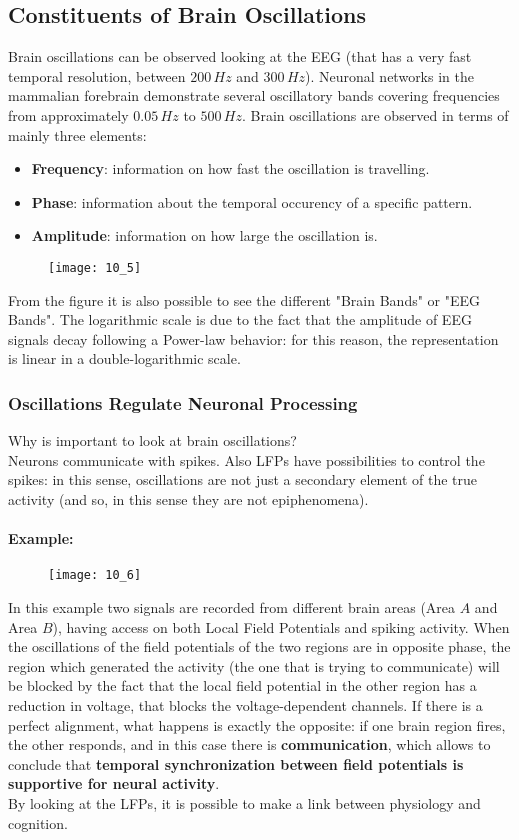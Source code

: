 \subsection{Constituents of Brain Oscillations}
Brain oscillations can be observed looking at the EEG (that has a very fast temporal resolution, between \(200\,Hz\) and \(300\,Hz\)).
Neuronal networks in the mammalian forebrain demonstrate several oscillatory bands covering frequencies from approximately \(0.05\,Hz\) to \(500\,Hz\).
Brain oscillations are observed in terms of mainly three elements:
\begin{itemize}
    \item \textbf{Frequency}: information on how fast the oscillation is travelling.
    \item \textbf{Phase}: information about the temporal occurency of a specific pattern.
    \item \textbf{Amplitude}: information on how large the oscillation is.
\end{itemize}
\begin{figure}[H]
    \texttt{[image: 10\_5]}
    \centering
\end{figure}
From the figure it is also possible to see the different "Brain Bands" or "EEG Bands". The logarithmic scale is due to the fact that the amplitude of EEG 
signals decay following a Power-law behavior: for this reason, the representation is linear in a double-logarithmic scale.

\subsubsection{Oscillations Regulate Neuronal Processing}
Why is important to look at brain oscillations? \\ Neurons communicate with spikes. Also LFPs have possibilities to control the spikes: in this sense, 
oscillations are not just a secondary element of the true activity (and so, in this sense they are not epiphenomena).

\paragraph{Example:}
\begin{figure}[H]
    \texttt{[image: 10\_6]}
    \centering
\end{figure}
In this example two signals are recorded from different brain areas (Area \(A\) and Area \(B\)), having access on both Local Field Potentials and spiking 
activity. When the oscillations of the field potentials of the two regions are in opposite phase, the region which generated the activity (the one that is 
trying to communicate) will be blocked by the fact that the local field potential in the other region has a reduction in voltage, that blocks the voltage-dependent 
channels. If there is a perfect alignment, what happens is exactly the opposite: if one brain region fires, the other responds, and in this case there is \textbf{
communication}, which allows to conclude that \textbf{temporal synchronization between field potentials is supportive for neural activity}.\\
By looking at the LFPs, it is possible to make a link between physiology and cognition.

